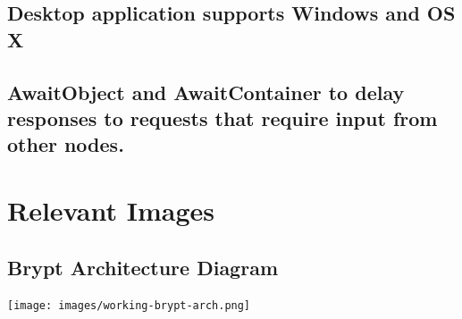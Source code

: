 \documentclass[tikz,a4paper,titlepage]{article}
\begin{document}
\subsection{Desktop application supports Windows and OS X}

\subsection{AwaitObject and AwaitContainer to delay responses to requests that require input from other nodes.}





\newpage
\section{Relevant Images}
\subsection{Brypt Architecture Diagram}
\texttt{[image: images/working-brypt-arch.png]}
\end{document}
